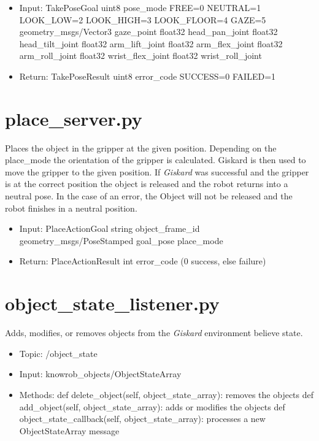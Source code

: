 \documentclass[main.tex]{subfiles}
\begin{document}
			\begin{itemize}
				\item Input: TakePoseGoal 
				\subitem uint8 pose\_mode
				\subsubitem FREE=0
				\subsubitem NEUTRAL=1
				\subsubitem LOOK\_LOW=2
				\subsubitem LOOK\_HIGH=3
				\subsubitem LOOK\_FLOOR=4
				\subsubitem GAZE=5
				\subitem geometry\_msgs/Vector3 gaze\_point
				\subitem float32 head\_pan\_joint
				\subitem float32 head\_tilt\_joint
				\subitem float32 arm\_lift\_joint
				\subitem float32 arm\_flex\_joint
				\subitem float32 arm\_roll\_joint
				\subitem float32 wrist\_flex\_joint
				\subitem float32 wrist\_roll\_joint
				\item Return: TakePoseResult
				\subitem uint8 error\_code 
				\subsubitem SUCCESS=0
				\subsubitem FAILED=1
			\end{itemize}
			
			
			\section{place\_server.py}  
			Places the object in the gripper at the given position. Depending on the place\_mode the orientation of the gripper is calculated. Giskard is then used to move the gripper to the given position. If \textit{Giskard} was successful and the gripper is at the correct position the object is released and the robot returns into a neutral pose. In the case of an error, the Object will not be released and the robot finishes in a neutral position. 
			
			\begin{itemize}
				\item Input: PlaceActionGoal 
				\subitem string object\_frame\_id 
				\subitem geometry\_msgs/PoseStamped goal\_pose
				\subitem place\_mode
				\item Return: PlaceActionResult
				\subitem int error\_code (0 success, else failure)
			\end{itemize}
			
			\section{object\_state\_listener.py} 
			Adds, modifies, or removes objects from the \textit{Giskard} environment believe state.
			
			\begin{itemize}
				\item Topic: /object\_state
				\item Input: knowrob\_objects/ObjectStateArray
				\item Methods:
				\subitem def delete\_object(self, object\_state\_array): removes the objects
				\subitem def add\_object(self, object\_state\_array): adds or modifies the objects
				\subitem def object\_state\_callback(self, object\_state\_array): processes a new ObjectStateArray message
			\end{itemize}
			
\end{document}
